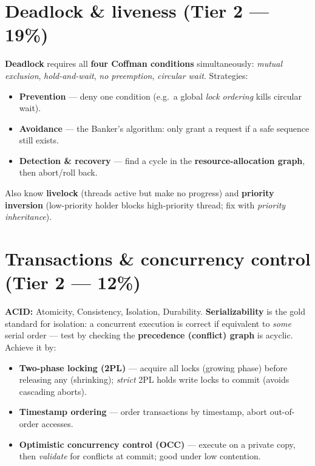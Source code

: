 \documentclass[11pt,a4paper]{article}
\begin{document}
\section{Deadlock \& liveness (Tier 2 --- 19\%)}

\begin{must}
\textbf{Deadlock} requires all \textbf{four Coffman conditions} simultaneously: \emph{mutual exclusion}, \emph{hold-and-wait}, \emph{no preemption}, \emph{circular wait}. Strategies:
\begin{itemize}[leftmargin=*,itemsep=0pt]
  \item \textbf{Prevention} --- deny one condition (e.g.\ a global \emph{lock ordering} kills circular wait).
  \item \textbf{Avoidance} --- the Banker's algorithm: only grant a request if a safe sequence still exists.
  \item \textbf{Detection \& recovery} --- find a cycle in the \textbf{resource-allocation graph}, then abort/roll back.
\end{itemize}
Also know \textbf{livelock} (threads active but make no progress) and \textbf{priority inversion} (low-priority holder blocks high-priority thread; fix with \emph{priority inheritance}).
\end{must}

\section{Transactions \& concurrency control (Tier 2 --- 12\%)}

\begin{must}
\textbf{ACID:} Atomicity, Consistency, Isolation, Durability. \textbf{Serializability} is the gold standard for isolation: a concurrent execution is correct if equivalent to \emph{some} serial order --- test by checking the \textbf{precedence (conflict) graph} is acyclic. Achieve it by:
\begin{itemize}[leftmargin=*,itemsep=0pt]
  \item \textbf{Two-phase locking (2PL)} --- acquire all locks (growing phase) before releasing any (shrinking); \emph{strict} 2PL holds write locks to commit (avoids cascading aborts).
  \item \textbf{Timestamp ordering} --- order transactions by timestamp, abort out-of-order accesses.
  \item \textbf{Optimistic concurrency control (OCC)} --- execute on a private copy, then \emph{validate} for conflicts at commit; good under low contention.
\end{itemize}
\end{must}
\end{document}
